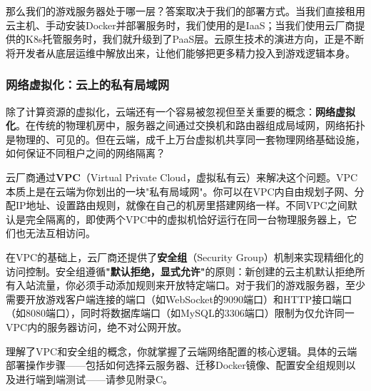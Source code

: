那么我们的游戏服务器处于哪一层？答案取决于我们的部署方式。当我们直接租用云主机、手动安装Docker并部署服务时，我们使用的是IaaS；当我们使用云厂商提供的K8s托管服务时，我们就升级到了PaaS层。云原生技术的演进方向，正是不断将开发者从底层运维中解放出来，让他们能够把更多精力投入到游戏逻辑本身。

\subsubsection{网络虚拟化：云上的私有局域网}

除了计算资源的虚拟化，云端还有一个容易被忽视但至关重要的概念：\textbf{网络虚拟化}。在传统的物理机房中，服务器之间通过交换机和路由器组成局域网，网络拓扑是物理的、可见的。但在云端，成千上万台虚拟机共享同一套物理网络基础设施，如何保证不同租户之间的网络隔离？

云厂商通过\textbf{VPC}（Virtual Private Cloud，虚拟私有云）来解决这个问题。VPC本质上是在云端为你划出的一块"私有局域网"。你可以在VPC内自由规划子网、分配IP地址、设置路由规则，就像在自己的机房里搭建网络一样。不同VPC之间默认是完全隔离的，即使两个VPC中的虚拟机恰好运行在同一台物理服务器上，它们也无法互相访问。

在VPC的基础上，云厂商还提供了\textbf{安全组}（Security Group）机制来实现精细化的访问控制。安全组遵循\textbf{"默认拒绝，显式允许"}的原则：新创建的云主机默认拒绝所有入站流量，你必须手动添加规则来开放特定端口。对于我们的游戏服务器，至少需要开放游戏客户端连接的端口（如WebSocket的9090端口）和HTTP接口端口（如8080端口），同时将数据库端口（如MySQL的3306端口）限制为仅允许同一VPC内的服务器访问，绝不对公网开放。

理解了VPC和安全组的概念，你就掌握了云端网络配置的核心逻辑。具体的云端部署操作步骤——包括如何选择云服务器、迁移Docker镜像、配置安全组规则以及进行端到端测试——请参见附录C。



